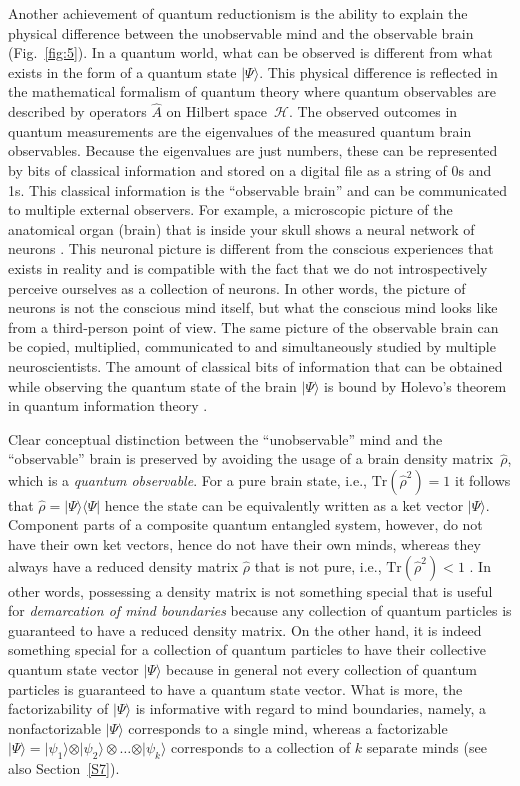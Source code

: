 \documentclass{ws-ijmpb}
\begin{document}
Another achievement of quantum reductionism is the ability to explain
the physical difference between the unobservable mind and the observable
brain (Fig.~\ref{fig:5}). In a quantum world, what can be observed
is different from what exists in the form of a quantum state $\vert \Psi\rangle$.
This physical difference is reflected in the mathematical formalism
of quantum theory where quantum observables are described by operators
$\hat{A}$ on Hilbert space~$\mathcal{H}$. The observed outcomes
in quantum measurements are the eigenvalues of the measured quantum
brain observables. Because the eigenvalues are just numbers, these
can be represented by bits of classical information and stored on
a digital file as a string of 0s and 1s. This classical information
is the ``observable brain'' and can be communicated to multiple
external observers. For example, a microscopic picture of the anatomical
organ (brain) that is inside your skull shows a neural network of
neurons \cite{DeFelipe2002}. This neuronal picture is different from the conscious experiences
that exists in reality and is compatible with the fact that we do
not introspectively perceive ourselves as a collection of neurons.
In other words, the picture of neurons is not the conscious mind itself,
but what the conscious mind looks like from a third-person point of
view. The same picture of the observable brain can be copied, multiplied, communicated to
and simultaneously studied by multiple neuroscientists. The amount
of classical bits of information that can be obtained while observing
the quantum state of the brain $\vert \Psi\rangle$ is bound by Holevo's theorem in
quantum information theory \cite{Holevo1973,Georgiev2020a,Georgiev2020b}.

Clear conceptual distinction between the ``unobservable'' mind and the ``observable'' brain is preserved by avoiding the usage of a brain density matrix~$\hat{\rho}$, which is a \emph{quantum observable}. For a pure brain state, i.e., $\textrm{Tr}(\hat{\rho}^2)=1$ it follows that $\hat{\rho} = \vert \Psi\rangle\langle\Psi\vert $ hence the state can be equivalently written as a ket vector $\vert \Psi\rangle$.
Component parts of a composite quantum entangled system, however, do not have their own ket vectors, hence do not have their own minds, whereas they always have a reduced density matrix $\hat{\rho}$ that is not pure, i.e., $\textrm{Tr}(\hat{\rho}^2)<1$ \cite{Georgiev2017}. In other words, possessing a density matrix is not something special that is useful for \emph{demarcation of mind boundaries} because any collection of quantum particles is guaranteed to have a reduced density matrix. On the other hand, it is indeed something special for a collection of quantum particles to have their collective quantum state vector $\vert \Psi\rangle$ because in general not every collection of quantum particles is guaranteed to have a quantum state vector. What is more, the factorizability of $\vert \Psi\rangle$ is informative with regard to mind boundaries, namely, a nonfactorizable $\vert \Psi\rangle$ corresponds to a single mind, whereas a factorizable $\vert \Psi\rangle=\vert \psi_1\rangle \otimes \vert \psi_2\rangle\otimes \ldots \otimes \vert \psi_k\rangle$ corresponds to a collection of $k$ separate minds \cite{Georgiev2017,Georgiev2021b} (see also Section~\ref{S7}).
\end{document}

